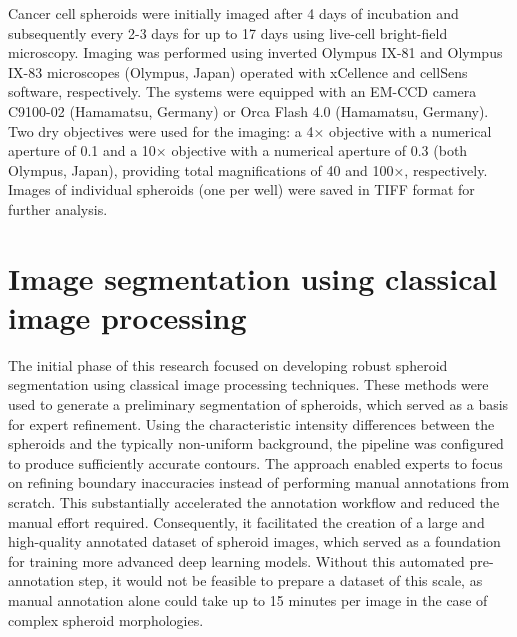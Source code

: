 \documentclass[preprint,12pt]{elsarticle}
\begin{document}
Cancer cell spheroids were initially imaged after 4 days of incubation and subsequently every 2-3 days for up to 17 days using live-cell bright-field microscopy. Imaging was performed using inverted Olympus IX-81 and Olympus IX-83 microscopes (Olympus, Japan) operated with xCellence and cellSens software, respectively. The systems were equipped with an EM-CCD camera C9100-02 (Hamamatsu, Germany) or Orca Flash 4.0 (Hamamatsu, Germany). Two dry objectives were used for the imaging: a 4× objective with a numerical aperture of 0.1 and a 10× objective with a numerical aperture of 0.3 (both Olympus, Japan), providing total magnifications of 40 and 100×, respectively. Images of individual spheroids (one per well) were saved in TIFF format for further analysis.


\section{Image segmentation using classical image processing}
\label{sec:segClassic}
The initial phase of this research focused on developing robust spheroid segmentation using classical image processing techniques. These methods were used to generate a preliminary segmentation of spheroids, which served as a basis for expert refinement. Using the characteristic intensity differences between the spheroids and the typically non-uniform background, the pipeline was configured to produce sufficiently accurate contours. The approach enabled experts to focus on refining boundary inaccuracies instead of performing manual annotations from scratch. This substantially accelerated the annotation workflow and reduced the manual effort required. Consequently, it facilitated the creation of a large and high-quality annotated dataset of spheroid images, which served as a foundation for training more advanced deep learning models. Without this automated pre-annotation step, it would not be feasible to prepare a dataset of this scale, as manual annotation alone could take up to 15 minutes per image in the case of complex spheroid morphologies.
\end{document}
